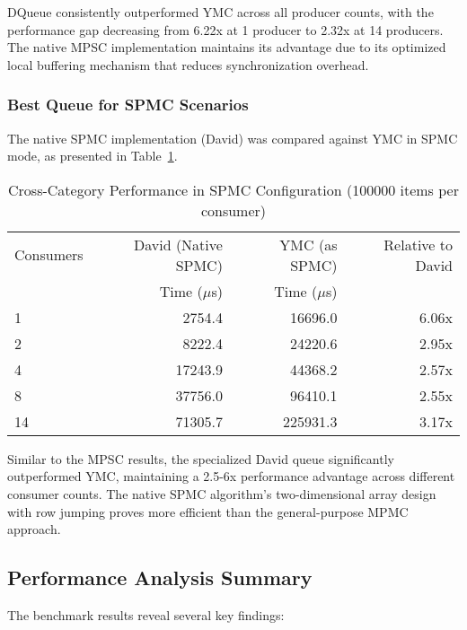 DQueue consistently outperformed \ac{YMC} across all producer counts, with the performance gap decreasing from 6.22x at 1 producer to 2.32x at 14 producers. The native \ac{MPSC} implementation maintains its advantage due to its optimized local buffering mechanism that reduces synchronization overhead.

\subsubsection{Best Queue for \ac{SPMC} Scenarios}\label{subsubsec:cross-spmc}
The native \ac{SPMC} implementation (David) was compared against \ac{YMC} in \ac{SPMC} mode, as presented in Table~\ref{tab:best-spmc}.

\begin{table}[htb]
\centering
\caption{Cross-Category Performance in \ac{SPMC} Configuration (100000 items per consumer)}
\label{tab:best-spmc}
\begin{tabular}{@{}lrrr@{}}
\toprule
Consumers & David (Native \ac{SPMC}) & \ac{YMC} (as \ac{SPMC}) & Relative to David \\
& Time ($\mu$s) & Time ($\mu$s) & \\
\midrule
1 & 2754.4 & 16696.0 & 6.06x \\
2 & 8222.4 & 24220.6 & 2.95x \\
4 & 17243.9 & 44368.2 & 2.57x \\
8 & 37756.0 & 96410.1 & 2.55x \\
14 & 71305.7 & 225931.3 & 3.17x \\
\bottomrule
\end{tabular}
\end{table}

Similar to the \ac{MPSC} results, the specialized David queue significantly outperformed \ac{YMC}, maintaining a 2.5-6x performance advantage across different consumer counts. The native \ac{SPMC} algorithm's two-dimensional array design with row jumping proves more efficient than the general-purpose \ac{MPMC} approach.

\subsection{Performance Analysis Summary}
The benchmark results reveal several key findings:

